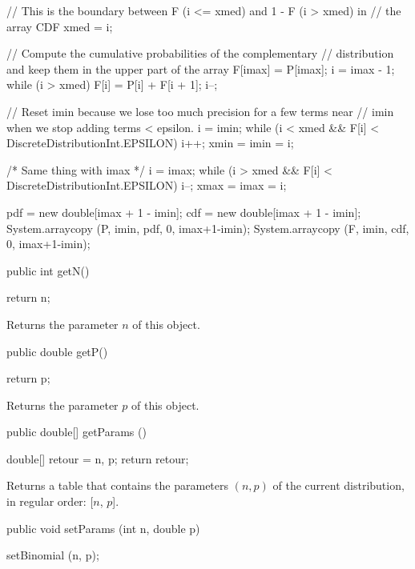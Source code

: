 \begin{code}
\begin{hide}
{      // This is the boundary between F (i <= xmed) and 1 - F (i > xmed) in
      // the array CDF
      xmed = i;

      // Compute the cumulative probabilities of the complementary
      // distribution and keep them in the upper part of the array
      F[imax] = P[imax];
      i = imax - 1;
      while (i > xmed) {
         F[i] = P[i] + F[i + 1];
         i--;
      }

       // Reset imin because we lose too much precision for a few terms near
       //   imin when we stop adding terms < epsilon.
       i = imin;
       while (i < xmed && F[i] < DiscreteDistributionInt.EPSILON)
          i++;
       xmin = imin = i;

       /* Same thing with imax */
       i = imax;
       while (i > xmed && F[i] < DiscreteDistributionInt.EPSILON)
          i--;
       xmax = imax = i;

       pdf  = new double[imax + 1 - imin];
       cdf  = new double[imax + 1 - imin];
       System.arraycopy (P, imin, pdf, 0, imax+1-imin);
       System.arraycopy (F, imin, cdf, 0, imax+1-imin);

   }\end{hide}
   public int getN()\begin{hide} {
      return n;
   }\end{hide}
\end{code}
\begin{tabb}
   Returns the parameter $n$ of this object.
\end{tabb}
\begin{code}

   public double getP()\begin{hide} {
      return p;
   }\end{hide}
\end{code}
\begin{tabb}
   Returns the parameter $p$ of this object.
\end{tabb}
\begin{code}

   public double[] getParams ()\begin{hide} {
      double[] retour = {n, p};
      return retour;
   }\end{hide}
\end{code}
\begin{tabb}
   Returns a table that contains the parameters $(n,p)$ of the current distribution,
   in regular order: [$n$, $p$].
\end{tabb}
\begin{code}

   public void setParams (int n, double p)\begin{hide} {
      setBinomial (n, p);
   }\end{hide}
\end{code}
